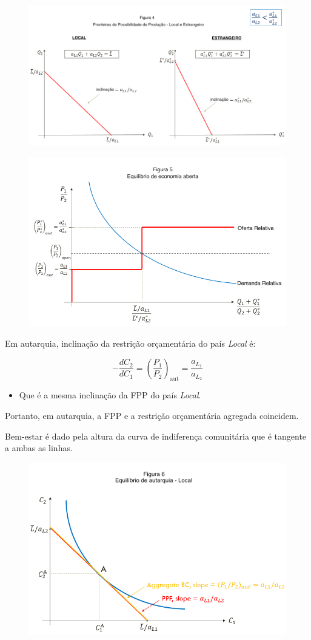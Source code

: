 \documentclass[a4paper,12pt]{article}[abntex2]
\begin{document}
\begin{figure}[H]
    \centering
    \includegraphics[width=0.7\linewidth]{Imagens/a9i6.png}
\end{figure}

\begin{figure}[H]
    \centering
    \includegraphics[width=0.7\linewidth]{Imagens/a9i7.png}
\end{figure}

Em autarquia, inclinação da restrição orçamentária do país \textit{Local} é:

\[
- \frac{dC_2}{dC_1} = \left(\frac{P_1}{P_2} \right)_{\text{aut}} = \frac{a_{L_1}}{a_{L_2}}
\]

\begin{itemize}
    \item Que é a mesma inclinação da FPP do país \textit{Local}.
\end{itemize}

Portanto, em autarquia, a FPP e a restrição orçamentária agregada coincidem.

Bem-estar é dado pela altura da curva de indiferença comunitária que é tangente a ambas as linhas.

\begin{figure}[H]
    \centering
    \includegraphics[width=0.7\linewidth]{Imagens/a9i8.png}
\end{figure}
\end{document}
